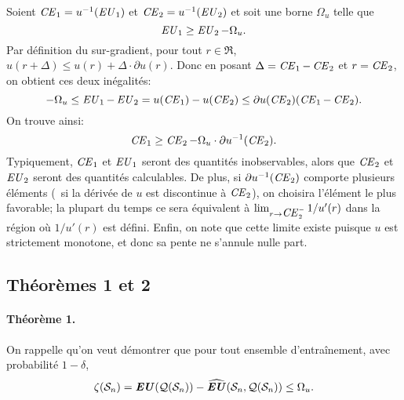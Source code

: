 \begin{lemme}
  \label{lem:ce}
  Soient $\nCE_1 = u^{-1}(\nEU_1)$ et $\nCE_2 = u^{-1}(\nEU_2)$ et soit une borne $\Omega_u$ telle
  que
  \begin{equation}
    \nEU_1 \geq \nEU_2 - \Omega_u.
  \end{equation}
  Par définition du sur-gradient, pour tout $r \in \Re$,
  $u(r+\Delta) \leq u(r) + \Delta\cdot\partial u(r)$. Donc en posant
  $\Delta = \nCE_1 - \nCE_2$ et $r=\nCE_2$, on obtient ces deux inégalités:
  \begin{equation}
    -\Omega_u \leq \nEU_1 - \nEU_2 = u(\nCE_1) - u(\nCE_2) \leq \partial u(\nCE_2)(\nCE_1 - \nCE_2).
  \end{equation}
  On trouve ainsi:
  \begin{equation}
    \nCE_1 \geq \nCE_2 - \Omega_u\cdot \partial u^{-1}(\nCE_2).
  \end{equation}
  Typiquement, $\nCE_1$ et $\nEU_1$ seront des quantités inobservables, alors que $\nCE_2$
  et $\nEU_2$ seront des quantités calculables. De plus, si $\partial u^{-1}(\nCE_2)$ comporte
  plusieurs éléments (\eg\ si la dérivée de $u$ est discontinue à $\nCE_2$), on choisira
  l'élément le plus favorable; la plupart du temps ce sera équivalent à
  $\lim_{r\to\nCE_2^{-}}1/u'(r)$ dans la région où $1/u'(r)$ est défini. Enfin, on note que
  cette limite existe puisque $u$ est strictement monotone, et donc sa pente ne s'annule
  nulle part.
\end{lemme}


\subsection{Théorèmes 1 et 2}

\paragraph{Théorème 1.} On rappelle qu'on veut démontrer que pour tout ensemble
d'entraînement, avec probabilité $1-\delta$, 
\begin{equation}
  \zeta(\S_n) = \EU(\alg(\S_n)) - \hEU(\S_n,\alg(\S_n)) \leq \Omega_u.
\end{equation}

